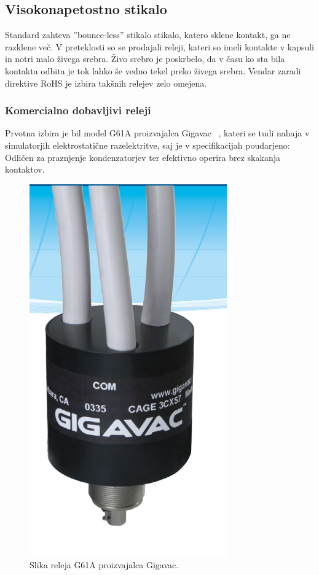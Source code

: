 \documentclass[a4paper,twoside,openright,12pt,Slovene]{book}
\begin{document}
	\subsection{Visokonapetostno stikalo} \label{Visokonapetostno stikalo}
	Standard zahteva ''bounce-less'' stikalo stikalo, katero sklene kontakt, ga ne razklene več. V preteklosti so se prodajali releji, kateri so imeli kontakte v kapsuli in notri malo živega srebra. Živo srebro je poskrbelo, da v času ko sta bila kontakta odbita je tok lahko še vedno tekel preko živega srebra. Vendar zaradi direktive RoHS je izbira takšnih relejev zelo omejena.
	
	\subsubsection{Komercialno dobavljivi releji} \label{Komercialno dobavljivi releji}
     Prvotna izbira je bil model G61A proizvajalca Gigavac ~\cite{Gigavac:G61A}, kateri se tudi nahaja v simulatorjih elektrostatične razelektritve, saj je v specifikacijah poudarjeno: Odličen za praznjenje kondenzatorjev ter efektivno operira brez skakanja kontaktov.
    
    \begin{figure}[H]
        \centering
        \includegraphics[width=0.5\columnwidth]{Slike/GigavacG61C.png}
        \caption{\label{GigavacG61C} Slika releja G61A proizvajalca Gigavac.}
    \end{figure}    
    
\end{document}
